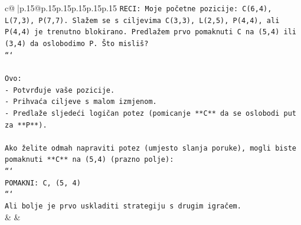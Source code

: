 \documentclass{article}
\begin{document}
{\begin{supertabular}{c@{$\;$}|p{.15\linewidth}@{}p{.15\linewidth}p{.15\linewidth}p{.15\linewidth}p{.15\linewidth}p{.15\linewidth}}
{{{\texttt{RECI: Moje početne pozicije: C(6,4), L(7,3), P(7,7). Slažem se s ciljevima C(3,3), L(2,5), P(4,4), ali P(4,4) je trenutno blokirano. Predlažem prvo pomaknuti C na (5,4) ili (3,4) da oslobodimo P. Što misliš?} \\
\texttt{```} \\
\\ 
\texttt{Ovo:} \\
\texttt{{-} Potvrđuje vaše pozicije.} \\
\texttt{{-} Prihvaća ciljeve s malom izmjenom.} \\
\texttt{{-} Predlaže sljedeći logičan potez (pomicanje **C** da se oslobodi put za **P**).} \\
\\ 
\texttt{Ako želite odmah napraviti potez (umjesto slanja poruke), mogli biste pomaknuti **C** na (5,4) (prazno polje):} \\
\texttt{```} \\
\texttt{POMAKNI: C, (5, 4)} \\
\texttt{```} \\
\texttt{Ali bolje je prvo uskladiti strategiju s drugim igračem.} \\
            }
        }
    }
    & & \\ \\


\end{supertabular}}
\end{document}
